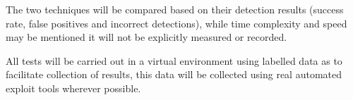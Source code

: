 The two techniques will be compared based on their detection results (success rate, false positives and incorrect detections), while time complexity and speed may be mentioned it will not be explicitly measured or recorded.

All tests will be carried out in a virtual environment using labelled data as to facilitate collection of results, this data will be collected using real automated exploit tools wherever possible.


